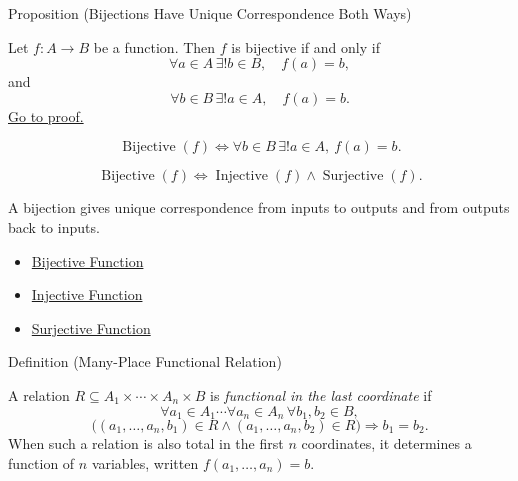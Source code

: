\begin{propositionbox}{Proposition (Bijections Have Unique Correspondence Both Ways)}
\begin{proposition}\label{prop:bijection-unique-both-directions}
Let $f:A\to B$ be a function. Then $f$ is bijective if and only if
\[
\forall a\in A\,\exists! b\in B,\quad f(a)=b,
\]
and
\[
\forall b\in B\,\exists! a\in A,\quad f(a)=b.
\]
\hyperref[prf:bijection-unique-both-directions]{Go to proof.}
\end{proposition}
\end{propositionbox}

\begin{remark*}
\[
  \operatorname{Bijective}(f)
  \iff
  \forall b\in B\,\exists!a\in A,\ f(a)=b.
\]
\end{remark*}

\begin{remark*}
\[
  \operatorname{Bijective}(f)
  \iff
  \operatorname{Injective}(f)\wedge\operatorname{Surjective}(f).
\]
\end{remark*}

\begin{remark*}[Interpretation]
A bijection gives unique correspondence from inputs to outputs and from outputs
back to inputs.
\end{remark*}

\begin{dependencies}
\begin{itemize}
  \item \hyperref[def:bijective]{Bijective Function}
  \item \hyperref[def:injective]{Injective Function}
  \item \hyperref[def:surjective]{Surjective Function}
\end{itemize}
\end{dependencies}

\begin{definitionbox}{Definition (Many-Place Functional Relation)}
\begin{definition}\label{def:many-place-functional-relation}
A relation $R\subseteq A_1\times\cdots\times A_n\times B$ is
\emph{functional in the last coordinate} if
\[
\forall a_1\in A_1\cdots\forall a_n\in A_n\,
\forall b_1,b_2\in B,
\]
\[
\bigl((a_1,\ldots,a_n,b_1)\in R\land
(a_1,\ldots,a_n,b_2)\in R\bigr)\Rightarrow b_1=b_2.
\]
When such a relation is also total in the first $n$ coordinates, it determines
a function of $n$ variables, written $f(a_1,\ldots,a_n)=b$.
\end{definition}
\end{definitionbox}

